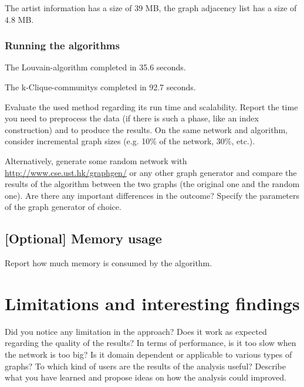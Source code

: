 \documentclass[11pt,a4paper,onecolumn,notitlepage]{article}
\begin{document}
The artist information has a size of 39 MB, the graph adjacency list has a size of 4.8 MB.

\subsubsection*{Running the algorithms}

The Louvain-algorithm completed in 35.6 seconds.

The k-Clique-communitys completed in 92.7 seconds.

Evaluate the used method regarding its run time and scalability. Report the time you need to preprocess  the data (if there is such a phase, like an index construction) and to produce the results. On the same network and algorithm, consider incremental graph sizes (e.g. 10\% of the network, 30\%, etc.). 

\smallskip
\noindent Alternatively, generate some random network with \url{http://www.cse.ust.hk/graphgen/} or any other graph generator and compare the results of the algorithm between the two graphs (the original one and the random one). Are there any important differences in the outcome? Specify the parameters of the graph generator of choice. 


\subsection{[Optional] Memory usage}
Report how much memory is consumed by the algorithm. 


\section{Limitations and interesting findings}

Did you notice any limitation in the approach? Does it work as expected regarding the quality of the results? In terms of performance, is it too slow when the network is too big? Is it domain dependent or applicable to various types of graphs? To which kind of users are the results of the analysis useful? Describe what you have learned and propose ideas on how the analysis could improved. 




  
\end{document}
